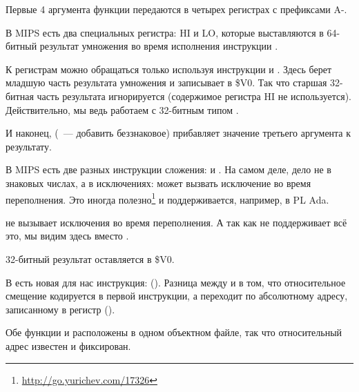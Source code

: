 


Первые 4 аргумента функции передаются в четырех регистрах с префиксами A-.

В MIPS есть два специальных регистра: HI и LO, которые выставляются в 64-битный результат умножения
во время исполнения инструкции .

К регистрам можно обращаться только используя инструкции  и .
Здесь  берет младшую часть результата умножения и записывает в \$V0.
Так что старшая 32-битная часть результата игнорируется (содержимое регистра HI не используется).
Действительно, мы ведь работаем с 32-битным типом \Tint.


И наконец,  (~--- добавить беззнаковое) прибавляет значение третьего аргумента к результату.

В MIPS есть две разных инструкции сложения:  и .
На самом деле, дело не в знаковых числах, а в исключениях:  может вызвать исключение
во время переполнения. Это иногда полезно\footnote{\url{http://go.yurichev.com/17326}} и поддерживается,
например, в \ac{PL} Ada.

 не вызывает исключения во время переполнения.
А так как \CCpp не поддерживает всё это, мы видим здесь  вместо .

32-битный результат оставляется в \$V0.

В \main есть новая для нас инструкция:  (). 
Разница между  и  в том, что относительное смещение кодируется в первой инструкции,
а  переходит по абсолютному адресу, записанному в регистр ().

Обе функции \ttf и \main расположены в одном объектном файле, так что относительный адрес \ttf известен и фиксирован.

